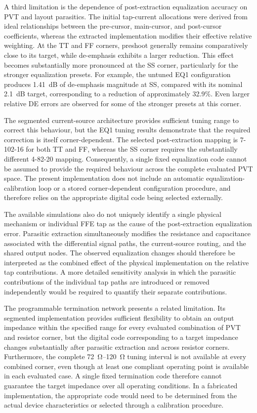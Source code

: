 A third limitation is the dependence of post-extraction equalization accuracy on \ac{PVT} and layout parasitics. The initial tap-current allocations were derived from ideal relationships between the pre-cursor, main-cursor, and post-cursor coefficients, whereas the extracted implementation modifies their effective relative weighting. At the \ac{TT} and \ac{FF} corners, preshoot generally remains comparatively close to its target, while de-emphasis exhibits a larger reduction. This effect becomes substantially more pronounced at the SS corner, particularly for the stronger equalization presets. For example, the untuned EQ1 configuration produces 1.41~dB of de-emphasis magnitude at SS, compared with its nominal 2.1~dB target, corresponding to a reduction of approximately 32.9\%. Even larger relative \ac{DE} errors are observed for some of the stronger presets at this corner.

The segmented current-source architecture provides sufficient tuning range to correct this behaviour, but the EQ1 tuning results demonstrate that the required correction is itself corner-dependent. The selected post-extraction mapping is 7-102-16 for both \ac{TT} and \ac{FF}, whereas the \ac{SS} corner requires the substantially different 4-82-20 mapping. Consequently, a single fixed equalization code cannot be assumed to provide the required behaviour across the complete evaluated \ac{PVT} space. The present implementation does not include an automatic equalization-calibration loop or a stored corner-dependent configuration procedure, and therefore relies on the appropriate digital code being selected externally.

The available simulations also do not uniquely identify a single physical mechanism or individual \ac{FFE} tap as the cause of the post-extraction equalization error. Parasitic extraction simultaneously modifies the resistance and capacitance associated with the differential signal paths, the current-source routing, and the shared output nodes. The observed equalization changes should therefore be interpreted as the combined effect of the physical implementation on the relative tap contributions. A more detailed sensitivity analysis in which the parasitic contributions of the individual tap paths are introduced or removed independently would be required to quantify their separate contributions.

The programmable termination network presents a related limitation. Its segmented implementation provides sufficient flexibility to obtain an output impedance within the specified range for every evaluated combination of \ac{PVT} and resistor corner, but the digital code corresponding to a target impedance changes substantially after parasitic extraction and across resistor corners. Furthermore, the complete \SIrange{72}{120}{\ohm} tuning interval is not available at every combined corner, even though at least one compliant operating point is available in each evaluated case. A single fixed termination code therefore cannot guarantee the target impedance over all operating conditions. In a fabricated implementation, the appropriate code would need to be determined from the actual device characteristics or selected through a calibration procedure.

